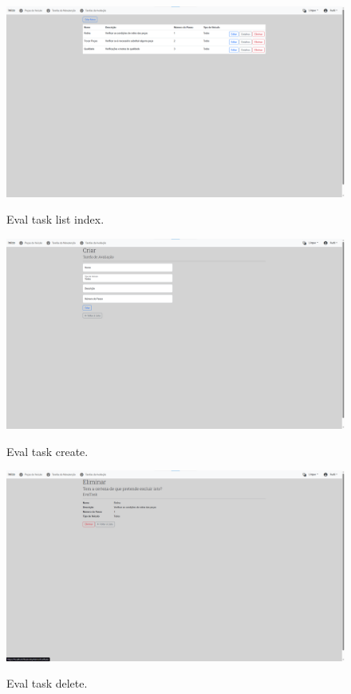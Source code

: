 \begin{figure}[h]
  \caption{Eval task list index.}
  \centering
  \includegraphics[width=\textwidth]{figs/Implementation/dealershipAdmin/evalIndex}
  \label{fig:figure2}

\end{figure}
\begin{figure}[h]
  \caption{Eval task create.}
  \centering
  \includegraphics[width=\textwidth]{figs/Implementation/dealershipAdmin/evalCreate}
  \label{fig:figure2}
\end{figure}

\begin{figure}[h]
  \caption{Eval task delete.}
  \centering
  \includegraphics[width=\textwidth]{figs/Implementation/dealershipAdmin/evalDelete}
  \label{fig:figure2}
\end{figure}

